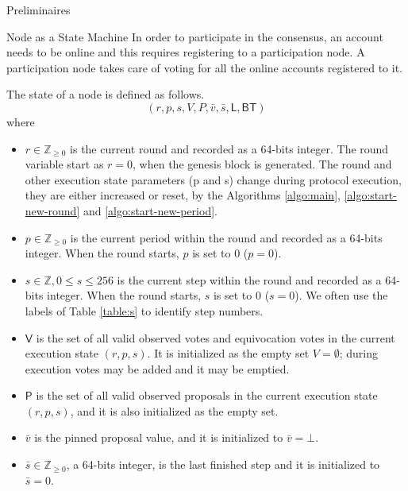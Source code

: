 \documentclass[10pt,a4paper]{article}
\begin{document}
\begin{section}{Preliminaires}
\begin{subsection}{Node as a State Machine}
In order to participate in the consensus, an account needs to be online and this requires
registering to a participation node. 
A participation node takes care of voting for all the online accounts registered to it.

The {\sf state of a node} is defined as follows. 
$$
(r, p, s, V, P, \bar{v}, \bar{s}, \mathsf{L}, \mathsf{BT})
$$ 
where
\begin{itemize}
    \item 
    $r\in\mathbb{Z}_{\ge 0}$ is the current {\sf round} and recorded as a 64-bits integer. 
    The round variable start as $r=0$, when the genesis block is generated. The round and other
    execution state parameters (p and s) change during protocol execution, they are either increased
    or reset, by the Algorithms \ref{algo:main}, \ref{algo:start-new-round} and \ref{algo:start-new-period}.
    
    \item 
    $p\in\mathbb{Z}_{\ge 0}$ is the current {\sf period} within the round and recorded as 
    a 64-bits integer. When the round starts, $p$ is set to 0 ($p=0$).
    
    \item 
    $s\in\mathbb{Z}, 0\le s\le 256$ is the current {\sf step} within the round 
    and recorded as a 64-bits integer. When the round starts, $s$ is set to 0 ($s=0$). 
    We often use the labels of Table \ref{table:s} to identify step numbers.
    
    \item
    $\mathsf{V}$ is the set of all valid {\sf observed votes} and 
    {\sf equivocation votes} in the current execution state
    $(r,p,s)$. It is initialized as the empty set $V=\emptyset$; during execution 
    votes may be added and it may be emptied.
    
    \item
    $\mathsf{P}$ is the set of all valid {\sf observed proposals}
    in the current execution state $(r,p,s)$, and it is also initialized as the empty set.
    
    \item
    $\bar{v}$ is the {\sf pinned proposal value}, and it is initialized to $\bar{v}=\bot$.
    
    \item
    $\bar{s}\in\mathbb{Z}_{\ge 0}$, a 64-bits integer, is the {\sf last finished step}
    and it is initialized to $\bar{s}=0$.
    

\end{itemize}
\end{subsection}
\end{section}
\end{document}
